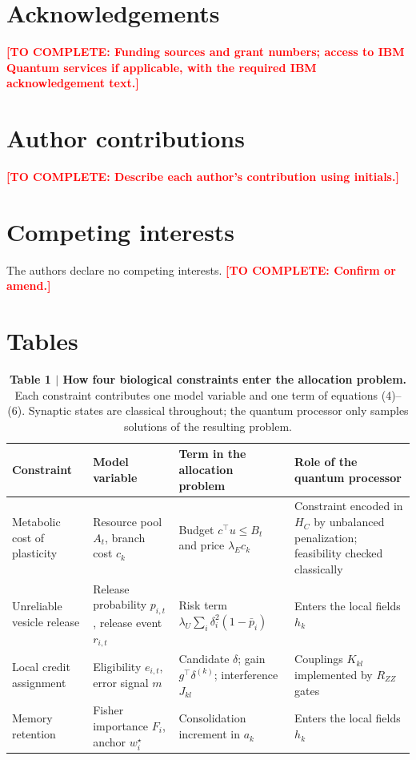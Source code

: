 \documentclass[12pt,a4paper]{article}
\newcommand{\todo}[1]{\textcolor{red}{\textbf{[TO COMPLETE: #1]}}}
\begin{document}
\section*{Acknowledgements}
\todo{Funding sources and grant numbers; access to IBM Quantum services if applicable, with the required IBM acknowledgement text.}

\section*{Author contributions}
\todo{Describe each author's contribution using initials.}

\section*{Competing interests}
The authors declare no competing interests. \todo{Confirm or amend.}

\clearpage
\section*{Tables}

\begin{table}[h]
\caption*{\textbf{Table 1 $|$ How four biological constraints enter the allocation problem.} Each constraint contributes one model variable and one term of equations (4)--(6). Synaptic states are classical throughout; the quantum processor only samples solutions of the resulting problem.}
\small
\begin{tabular}{p{2.6cm}p{3.6cm}p{4.6cm}p{4.0cm}}
\toprule
Constraint & Model variable & Term in the allocation problem & Role of the quantum processor \\
\midrule
Metabolic cost of plasticity & Resource pool $A_{t}$, branch cost $c_{k}$ & Budget $c^{\top}u\le B_{t}$ and price $\lambda_{E}c_{k}$ & Constraint encoded in $H_{C}$ by unbalanced penalization; feasibility checked classically \\
Unreliable vesicle release & Release probability $p_{i,t}$, release event $r_{i,t}$ & Risk term $\lambda_{U}\sum_{i}\delta_{i}^{2}(1-\bar p_{i})$ & Enters the local fields $h_{k}$ \\
Local credit assignment & Eligibility $e_{i,t}$, error signal $m$ & Candidate $\delta$; gain $g^{\top}\delta^{(k)}$; interference $J_{kl}$ & Couplings $K_{kl}$ implemented by $R_{ZZ}$ gates \\
Memory retention & Fisher importance $F_{i}$, anchor $w_{i}^{\star}$ & Consolidation increment in $a_{k}$ & Enters the local fields $h_{k}$ \\
\bottomrule
\end{tabular}
\end{table}
\end{document}
